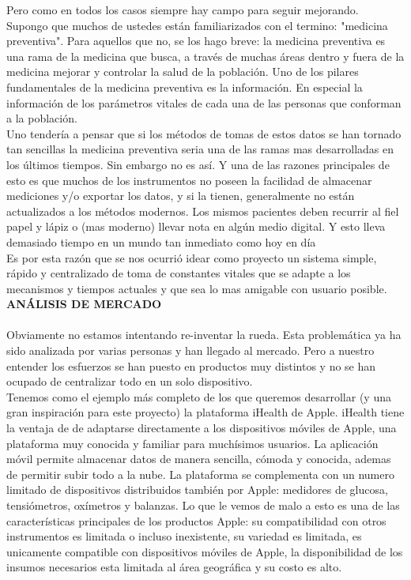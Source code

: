 \documentclass[11pt]{report}
\begin{document}
Pero como en todos los casos siempre hay campo para seguir mejorando.\\

Supongo que muchos de ustedes están familiarizados con el termino: "medicina preventiva". Para aquellos que no, se los hago breve: la medicina preventiva es una rama de la medicina que busca, a través de muchas áreas dentro y fuera de la medicina mejorar y controlar la salud de la población. Uno de los pilares fundamentales de la medicina preventiva es la información. En especial la información de los parámetros vitales de cada una de las personas que conforman a la población.\\

Uno tendería a pensar que si los métodos de tomas de estos datos se han tornado tan sencillas la medicina preventiva seria una de las ramas mas desarrolladas en los últimos tiempos. Sin embargo no es así. Y una de las razones principales de esto es que muchos de los instrumentos no poseen la facilidad de almacenar mediciones y/o exportar
los datos, y si la tienen, generalmente  no están actualizados a los métodos modernos.
Los mismos pacientes deben recurrir al fiel papel y lápiz o (mas moderno) llevar nota en algún medio digital. Y esto lleva demasiado tiempo en un mundo tan inmediato como hoy en día\\

Es por esta razón que se nos ocurrió idear como proyecto un sistema simple, rápido y centralizado de toma de constantes vitales que se adapte a los mecanismos y tiempos actuales y que sea lo mas amigable con usuario posible.\\


\newpage
\noindent \Large \textbf{ANÁLISIS DE MERCADO} \\
\\

Obviamente no estamos intentando re-inventar la rueda. Esta problemática ya ha sido analizada por varias personas y han llegado al mercado. Pero a nuestro entender los esfuerzos se han puesto en productos muy distintos y no se han ocupado de centralizar todo en un solo dispositivo.\\

Tenemos como el ejemplo más completo de los que queremos desarrollar (y una gran inspiración para este proyecto) la plataforma iHealth de Apple. iHealth tiene la ventaja de de adaptarse directamente a los dispositivos móviles de Apple, una plataforma muy conocida y familiar para muchísimos usuarios. La aplicación móvil permite almacenar datos de manera sencilla, cómoda y conocida, ademas de permitir subir todo a la nube. La plataforma se complementa con un numero limitado de dispositivos distribuidos también por Apple: medidores de glucosa, tensiómetros, oxímetros y
balanzas. Lo que le vemos de malo a esto es una de las características principales de los productos Apple: su compatibilidad con otros instrumentos es limitada o incluso inexistente, su variedad es limitada, es unicamente compatible con dispositivos móviles de Apple, la disponibilidad de los insumos necesarios esta limitada al área geográfica y su costo es alto.\\
\end{document}
